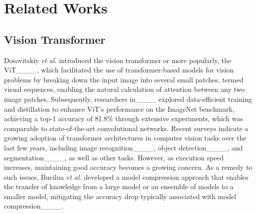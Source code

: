 \section{Related Works}
\subsection{Vision Transformer}

Dosovitskiy \textit{et al.} introduced the vision transformer or more popularly, the ViT____, which facilitated the use of transformer-based models for vision problems by breaking down the input image into several small patches, termed visual sequences, enabling the natural calculation of attention between any two image patches. Subsequently, researchers in____ explored data-efficient training and distillation to enhance ViT's performance on the ImageNet benchmark, achieving a top-1 accuracy of 81.8\% through extensive experiments, which was comparable to state-of-the-art convolutional networks. Recent surveys indicate a growing adoption of transformer architectures in computer vision tasks over the last few years, including image recognition____, object detection____, and segmentation____, as well as other tasks. However, as execution speed increases, maintaining good accuracy becomes a growing concern. As a remedy to such issues, Bucilua \textit{et al.} developed a model compression approach that enables the transfer of knowledge from a large model or an ensemble of models to a smaller model, mitigating the accuracy drop typically associated with model compression____.



